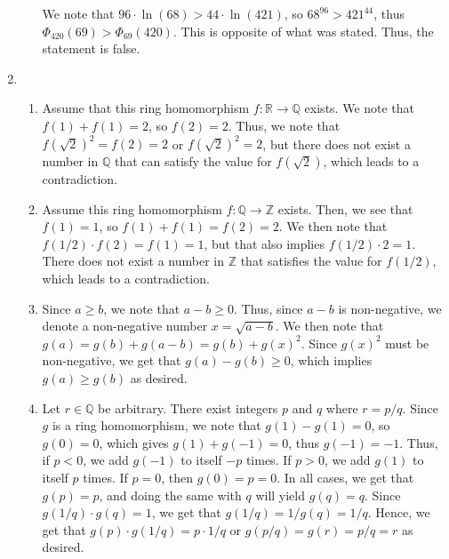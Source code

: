 \documentclass{article}
\begin{document}
\begin{enumerate}
\begin{enumerate}
    We note that $96 \cdot \ln(68) > 44 \cdot\ln(421)$, so $68^{96} > 421^{44}$, thus $\Phi_{420}(69) > \Phi_{69}(420)$. This is opposite of what was stated. Thus, the statement is false. 
    
    \end{enumerate}

    \newpage

    \item
    \begin{enumerate}
        \item 
        Assume that this ring homomorphism $f: \mathbb{R} \rightarrow \mathbb{Q}$ exists. We note that $f(1) + f(1) = 2$, so $f(2) = 2$. Thus, we note that $f(\sqrt{2})^2=f(2)=2$ or $f(\sqrt{2})^2=2$, but there does not exist a number in $\mathbb{Q}$ that can satisfy the value for $f(\sqrt{2})$, which leads to a contradiction. \\

        \item 
        Assume this ring homomorphism $f: \mathbb{Q} \rightarrow \mathbb{Z}$ exists. Then, we see that $f(1) = 1$, so $f(1) + f(1) = f(2) = 2$. We then note that $f(1/2)\cdot f(2) = f(1) =1$, but that also implies $f(1/2) \cdot 2 = 1$. There does not exist a number in $\mathbb{Z}$ that satisfies the value for $f(1/2)$, which leads to a contradiction. \\

        \item 
        Since $a \geq b$, we note that $a - b \geq 0$. Thus, since $a-b$ is non-negative, we denote a non-negative number $x = \sqrt{a -b}$. We then note that $g(a) = g(b) + g(a - b) = g(b) + g(x)^2$. Since $g(x)^2$ must be non-negative, we get that $g(a) - g(b) \geq 0$, which implies $g(a) \geq g(b)$ as desired.\\

        \item 
        Let $r \in \mathbb{Q}$ be arbitrary. There exist integers $p$ and $q$ where $r = p/q$. Since $g$ is a ring homomorphism, we note that $g(1) - g(1) = 0$, so $g(0) = 0$, which gives $g(1) + g(-1) = 0$, thus $g(-1) = -1$. Thus, if $p < 0$, we add $g(-1)$ to itself $-p$ times. If $p > 0$, we add $g(1)$ to itself $p$ times. If $p = 0$, then $g(0) = p = 0$. In all cases, we get that $g(p) = p$, and doing the same with $q$ will yield $g(q) = q$. Since $g(1/q) \cdot g(q) = 1$, we get that $g(1/q) = 1/ g(q) = 1/q$. Hence, we get that $g(p) \cdot g(1/q) = p \cdot 1/q$ or $g(p/q) = g(r) = p/q = r$ as desired. 
    \end{enumerate}


\end{enumerate}
\end{document}
